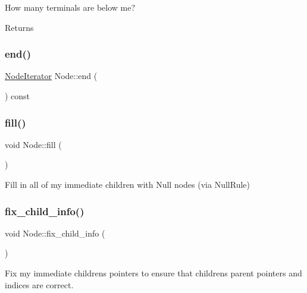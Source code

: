How many terminals are below me? \begin{DoxyReturn}{Returns}

\end{DoxyReturn}
\mbox{\label{class_node_aea7c6e778d4720fb8071af71c57b1628}} 
\subsubsection{\texorpdfstring{end()}{end()}}
{\footnotesize\ttfamily \hyperlink{class_node_1_1_node_iterator}{Node\+Iterator} Node\+::end (\begin{DoxyParamCaption}{ }\end{DoxyParamCaption}) const\hspace{0.3cm}{\ttfamily [inline]}}

\mbox{\label{class_node_a1c03973664fcfdfb191feb67f565168b}} 
\subsubsection{\texorpdfstring{fill()}{fill()}}
{\footnotesize\ttfamily void Node\+::fill (\begin{DoxyParamCaption}{ }\end{DoxyParamCaption})\hspace{0.3cm}{\ttfamily [inline]}}

Fill in all of my immediate children with Null nodes (via Null\+Rule)\mbox{\label{class_node_a8f25f44608c0b19fe02eaf19ade9ea68}} 
\subsubsection{\texorpdfstring{fix\+\_\+child\+\_\+info()}{fix\_child\_info()}}
{\footnotesize\ttfamily void Node\+::fix\+\_\+child\+\_\+info (\begin{DoxyParamCaption}{ }\end{DoxyParamCaption})\hspace{0.3cm}{\ttfamily [inline]}}

Fix my immediate children\textquotesingle{}s pointers to ensure that children\textquotesingle{}s parent pointers and indices are correct.\mbox{\label{class_node_a93fc84b584f080593978d3a39631d3e5}} 
